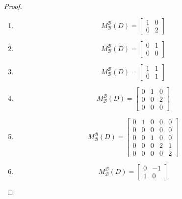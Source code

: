 \begin{proof}
    \begin{enumerate}[label={(\alph*)}]
        \item \[
                  M^{\mathscr{B}}_{\mathscr{B}}(D) =
                  \begin{bmatrix}
                      1 & 0 \\
                      0 & 2
                  \end{bmatrix}
              \]
        \item \[
                  M^{\mathscr{B}}_{\mathscr{B}}(D) =
                  \begin{bmatrix}
                      0 & 1 \\
                      0 & 0
                  \end{bmatrix}
              \]
        \item \[
                  M^{\mathscr{B}}_{\mathscr{B}}(D) =
                  \begin{bmatrix}
                      1 & 1 \\
                      0 & 1
                  \end{bmatrix}
              \]
        \item \[
                  M^{\mathscr{B}}_{\mathscr{B}}(D) =
                  \begin{bmatrix}
                      0 & 1 & 0 \\
                      0 & 0 & 2 \\
                      0 & 0 & 0
                  \end{bmatrix}
              \]
        \item \[
                  M^{\mathscr{B}}_{\mathscr{B}}(D) =
                  \begin{bmatrix}
                      0 & 1 & 0 & 0 & 0 \\
                      0 & 0 & 0 & 0 & 0 \\
                      0 & 0 & 1 & 0 & 0 \\
                      0 & 0 & 0 & 2 & 1 \\
                      0 & 0 & 0 & 0 & 2
                  \end{bmatrix}
              \]
        \item \[
                  M^{\mathscr{B}}_{\mathscr{B}}(D) =
                  \begin{bmatrix}
                      0 & -1 \\
                      1 & 0
                  \end{bmatrix}
              \]
    \end{enumerate}
\end{proof}


